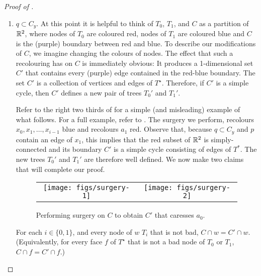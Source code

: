 \documentclass[a4paper,UKenglish]{socg-lipics-v2019}
\newcommand{\dual}[1]{{#1}^\star}
\begin{document}
\begin{proof}[Proof of ]
\begin{enumerate}
   \item $q\subset C_y$.  At this point it is helpful to think of
   $T_0$, $T_1$, and $C$ as a partition of $\mathbb{R}^2$, where nodes of $T_0$
   are coloured red, nodes of $T_1$ are coloured blue and $C$ is the
   (purple) boundary between red and blue.  To describe our modifications
   of $C$, we imagine changing the colours of nodes.  The effect that
   such a recolouring has on $C$ is immediately obvious: It produces a
   1-dimensional set $C'$ that contains every (purple) edge contained in
   the red-blue boundary. The set $C'$ is a collection of vertices and
   edges of $\dual{T}$. Therefore, if $C'$ is a simple cycle, then $C'$
   defines a new pair of trees $T_0'$ and $T_1'$.


   Refer to the right two thirds of  for a simple
   (and misleading) example of what follows. For a full example,
   refer to .  The surgery we perform, recolours
   $x_0,x_1,\ldots,x_{i-1}$ blue and recolours $a_1$ red.  Observe that,
   because $q\subset C_y$ and $p$ contain an edge of $x_1$, this implies
   that the red subset of $\mathbb{R}^2$ is simply-connected and its boundary $C'$
   is a simple cycle consisting of edges of $T^*$.  The new trees $T_0'$
   and $T_1'$ are therefore well defined.  We now make two claims that
   will complete our proof.

   \begin{figure}
     \begin{center}
       \begin{tabular}{cc}
         \texttt{[image: figs/surgery-1]} &
         \texttt{[image: figs/surgery-2]} 
       \end{tabular}
     \end{center}
     \caption{Performing surgery on $C$ to obtain $C'$ that caresses $a_0$.}
   \end{figure}

   \begin{clm}
      For each $i\in\{0,1\}$, and every node of $w$ $T_i$ that is not bad,
      $C\cap w=C'\cap w$.  (Equivalently, for every face $f$ of $\dual{T}$
      that is not a bad node of $T_0$ or $T_1$, $C\cap f=C'\cap f$.)
   \end{clm}


\end{enumerate}
\end{proof}
\end{document}
